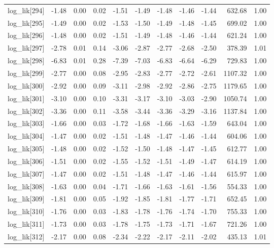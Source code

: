 \begin{table}[ht]
\begin{tabular}{rrrrrrrrrrr}
  log\_lik[294] & -1.48 & 0.00 & 0.02 & -1.51 & -1.49 & -1.48 & -1.46 & -1.44 & 632.68 & 1.00 \\ 
  log\_lik[295] & -1.49 & 0.00 & 0.02 & -1.53 & -1.50 & -1.49 & -1.48 & -1.45 & 699.02 & 1.00 \\ 
  log\_lik[296] & -1.48 & 0.00 & 0.02 & -1.51 & -1.49 & -1.48 & -1.46 & -1.44 & 621.24 & 1.00 \\ 
  log\_lik[297] & -2.78 & 0.01 & 0.14 & -3.06 & -2.87 & -2.77 & -2.68 & -2.50 & 378.39 & 1.01 \\ 
  log\_lik[298] & -6.83 & 0.01 & 0.28 & -7.39 & -7.03 & -6.83 & -6.64 & -6.29 & 729.83 & 1.00 \\ 
  log\_lik[299] & -2.77 & 0.00 & 0.08 & -2.95 & -2.83 & -2.77 & -2.72 & -2.61 & 1107.32 & 1.00 \\ 
  log\_lik[300] & -2.92 & 0.00 & 0.09 & -3.11 & -2.98 & -2.92 & -2.86 & -2.75 & 1179.65 & 1.00 \\ 
  log\_lik[301] & -3.10 & 0.00 & 0.10 & -3.31 & -3.17 & -3.10 & -3.03 & -2.90 & 1050.74 & 1.00 \\ 
  log\_lik[302] & -3.36 & 0.00 & 0.11 & -3.58 & -3.44 & -3.36 & -3.29 & -3.16 & 1137.84 & 1.00 \\ 
  log\_lik[303] & -1.66 & 0.00 & 0.03 & -1.72 & -1.68 & -1.66 & -1.63 & -1.59 & 643.04 & 1.00 \\ 
  log\_lik[304] & -1.47 & 0.00 & 0.02 & -1.51 & -1.48 & -1.47 & -1.46 & -1.44 & 604.06 & 1.00 \\ 
  log\_lik[305] & -1.48 & 0.00 & 0.02 & -1.52 & -1.50 & -1.48 & -1.47 & -1.45 & 612.77 & 1.00 \\ 
  log\_lik[306] & -1.51 & 0.00 & 0.02 & -1.55 & -1.52 & -1.51 & -1.49 & -1.47 & 614.19 & 1.00 \\ 
  log\_lik[307] & -1.47 & 0.00 & 0.02 & -1.51 & -1.48 & -1.47 & -1.46 & -1.44 & 615.97 & 1.00 \\ 
  log\_lik[308] & -1.63 & 0.00 & 0.04 & -1.71 & -1.66 & -1.63 & -1.61 & -1.56 & 554.33 & 1.00 \\ 
  log\_lik[309] & -1.81 & 0.00 & 0.05 & -1.92 & -1.85 & -1.81 & -1.77 & -1.71 & 652.45 & 1.00 \\ 
  log\_lik[310] & -1.76 & 0.00 & 0.03 & -1.83 & -1.78 & -1.76 & -1.74 & -1.70 & 755.33 & 1.00 \\ 
  log\_lik[311] & -1.73 & 0.00 & 0.03 & -1.78 & -1.75 & -1.73 & -1.71 & -1.67 & 721.26 & 1.00 \\ 
  log\_lik[312] & -2.17 & 0.00 & 0.08 & -2.34 & -2.22 & -2.17 & -2.11 & -2.02 & 435.13 & 1.01 \\ 

\end{tabular}
\end{table}
